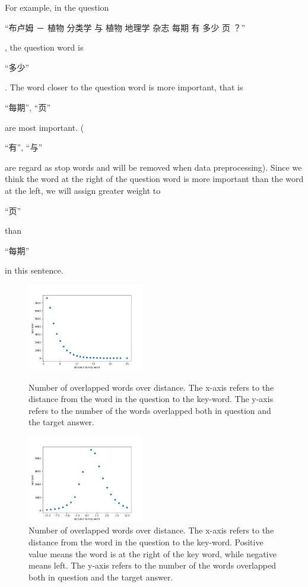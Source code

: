 \documentclass{llncs}
\begin{document}
For example, in the question \begin{CJK}{UTF8}{gbsn}
“布卢姆 － 植物 分类学 与 植物 地理学 杂志 每期 有 多少 页 ？”
\end{CJK}, the question word is \begin{CJK}{UTF8}{gbsn}“多少”\end{CJK}. The word closer to the question word is more important, that is \begin{CJK}{UTF8}{gbsn}“每期”, “页”\end{CJK} are most important. (\begin{CJK}{UTF8}{gbsn}“有”, “与”\end{CJK} are regard as stop words and will be removed when data preprocessing). Since we think the word at the right of the question word is more important than the word at the left, we will assign greater weight to \begin{CJK}{UTF8}{gbsn}“页”\end{CJK} than \begin{CJK}{UTF8}{gbsn}“每期”\end{CJK} in this sentence.

\begin{figure}
\centering
\begin{minipage}{.45\textwidth}
  \includegraphics[width=2in]{overlap-distance.jpg}
  \caption{Number of overlapped words over distance. The x-axis refers to the distance from the word in the question to the key-word. The y-axis refers to the number of the words overlapped both in question and the target answer.}
\end{minipage}%
\hfill
\begin{minipage}{.45\textwidth}
  \includegraphics[width=2in]{overlap-distance-all.jpg}
  \caption[width=\textwidth]{Number of overlapped words over distance. The x-axis refers to the distance from the word in the question to the key-word. Positive value means the word is at the right of the key word, while negative means left. The y-axis refers to the number of the words overlapped both in question and the target answer.}
\end{minipage}
\end{figure}
\end{document}
